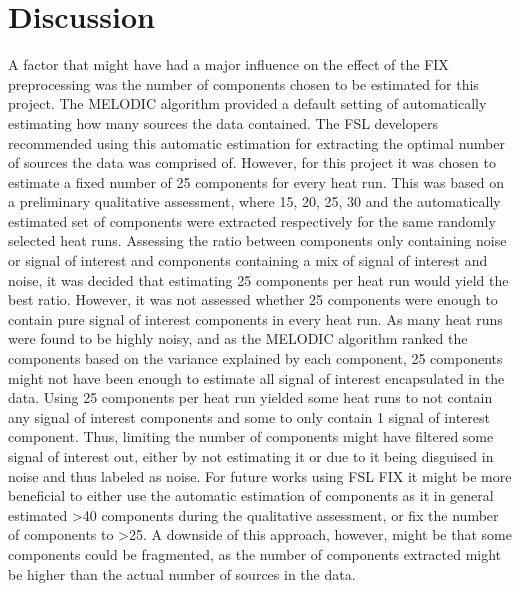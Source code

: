 \chapter{Discussion}
A factor that might have had a major influence on the effect of the FIX preprocessing was the number of components chosen to be estimated for this project. The MELODIC algorithm provided a default setting of automatically estimating how many sources the data contained. The FSL developers recommended using this automatic estimation for extracting the optimal number of sources the data was comprised of. However, for this project it was chosen to estimate a fixed number of 25 components for every heat run. This was based on a preliminary qualitative assessment, where 15, 20, 25, 30 and the automatically estimated set of components were extracted respectively for the same randomly selected heat runs. Assessing the ratio between components only containing noise or signal of interest and components containing a mix of signal of interest and noise, it was decided that estimating 25 components per heat run would yield the best ratio. However, it was not assessed whether 25 components were enough to contain pure signal of interest components in every heat run. As many heat runs were found to be highly noisy, and as the MELODIC algorithm ranked the components based on the variance explained by each component, 25 components might not have been enough to estimate all signal of interest encapsulated in the data. Using 25 components per heat run yielded some heat runs to not contain any signal of interest components and some to only contain 1 signal of interest component. Thus, limiting the number of components might have filtered some signal of interest out, either by not estimating it or due to it being disguised in noise and thus labeled as noise. For future works using FSL FIX it might be more beneficial to either use the automatic estimation of components as it in general estimated >40 components during the qualitative assessment, or fix the number of components to >25. A downside of this approach, however, might be that some components could be fragmented, as the number of components extracted might be higher than the actual number of sources in the data. \\

